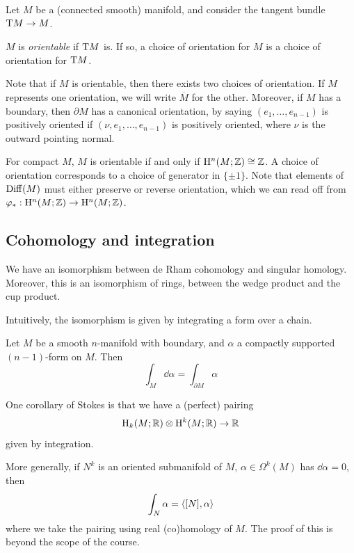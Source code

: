 \documentclass{article}
\begin{document}
Let \(M\) be a (connected smooth) manifold, and consider the tangent bundle \(\mathrm{T} M \to M\).

\begin{definition}
    \(M\) is \emph{orientable} if \(\mathrm{T} M\) is. If so, a choice of orientation for \(M\) is a choice of orientation for \(\mathrm{T} M\).
\end{definition}

Note that if \(M\) is orientable, then there exists two choices of orientation. If \(M\) represents one orientation, we will write \(\overline{M}\) for the other. Moreover, if \(M\) has a boundary, then \(\partial M\) has a canonical orientation, by saying \((e_1, \dots, e_{n-1})\) is positively oriented if \((\nu, e_1, \dots, e_{n-1})\) is positively oriented, where \(\nu\) is the outward pointing normal.

For compact \(M\), \(M\) is orientable if and only if \(\mathrm{H}^n(M; \mathbb{Z}) \cong \mathbb{Z}\). A choice of orientation corresponds to a choice of generator in \(\{\pm 1\}\). Note that elements of \(\operatorname{Diff}(M)\) must either preserve or reverse orientation, which we can read off from \(\varphi_* : \mathrm{H}^n(M; \mathbb{Z}) \to \mathrm{H}^n(M; \mathbb{Z})\).

\subsection{Cohomology and integration}

\begin{theorem}
    [de Rham] We have an isomorphism between de Rham cohomology and singular homology. Moreover, this is an isomorphism of rings, between the wedge product and the cup product.
\end{theorem}

Intuitively, the isomorphism is given by integrating a form over a chain.

\begin{theorem}
    [Stokes]
    Let \(M\) be a smooth \(n\)-manifold with boundary, and \(\alpha\) a compactly supported \((n-1)\)-form on \(M\). Then
    \[\int_M \dd\alpha = \int_{\partial M}\alpha\]
\end{theorem}

\lec

One corollary of Stokes is that we have a (perfect) pairing
\[\mathrm{H}_k(M; \mathbb{R}) \otimes \mathrm{H}^k(M; \mathbb{R}) \to \mathbb{R}\]
given by integration.

More generally, if \(N^k\) is an oriented submanifold of \(M\), \(\alpha \in \Omega^k(M)\) has \(\dd \alpha = 0\), then
\[\int_N \alpha = \left\langle [N], \alpha \right\rangle\]
where we take the pairing using real (co)homology of \(M\). The proof of this is beyond the scope of the course.
\end{document}
